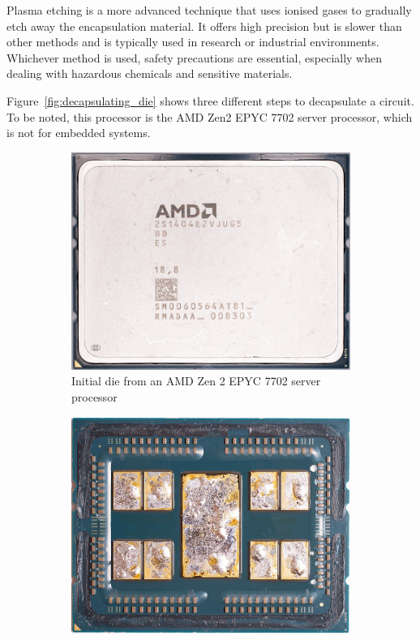 Plasma etching is a more advanced technique that uses ionised gases to gradually etch away the encapsulation material. It offers high precision but is slower than other methods and is typically used in research or industrial environments. Whichever method is used, safety precautions are essential, especially when dealing with hazardous chemicals and sensitive materials.

Figure~\ref{fig:decapsulating_die} shows three different steps to decapsulate a circuit. To be noted, this processor is the AMD Zen2 EPYC 7702 server processor, which is not for embedded systems.

\begin{figure}[ht]
    \centering
    \begin{subfigure}[b]{0.3\textwidth}
        \includegraphics[width=\textwidth]{c2_soa/img/epyc_7702_initial.jpg}
        \caption{Initial die from an AMD Zen 2 EPYC 7702 server processor}
        \label{fig:initial_die}
    \end{subfigure}
    \hfill
    \begin{subfigure}[b]{0.3\textwidth}
        \includegraphics[width=\textwidth]{c2_soa/img/epyc_7702_delidding.jpg}

\end{subfigure}
\end{figure}
